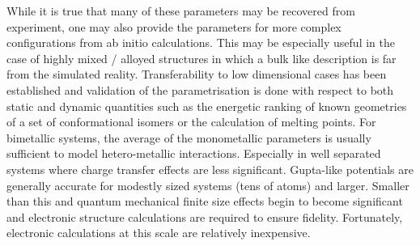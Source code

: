 While it is true that many of these parameters may be recovered from experiment, one may also provide the parameters for more complex configurations from ab initio calculations. This may be especially useful in the case of highly mixed / alloyed structures in which a bulk like description is far from the simulated reality. Transferability to low dimensional cases has been established and validation of the parametrisation is done with respect to both static and dynamic quantities such as the energetic ranking of known geometries of a set of conformational isomers or the calculation of melting points. For bimetallic systems, the average of the monometallic parameters is usually sufficient to model hetero-metallic interactions. Especially in well separated systems where charge transfer effects are less significant. Gupta-like potentials are generally accurate for modestly sized systems (tens of atoms) and larger. Smaller than this and quantum mechanical finite size effects begin to become significant and electronic structure calculations are required to ensure fidelity. Fortunately, electronic calculations at this scale are relatively inexpensive.


